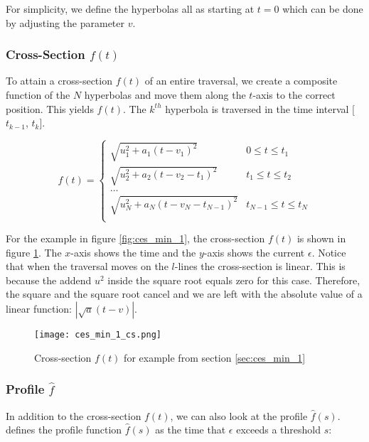 For simplicity, we define the hyperbolas all as starting at $t=0$ which can be done by adjusting the parameter $v$.


\subsubsection{Cross-Section $f(t)$}

To attain a cross-section $f(t)$ of an entire traversal, we create a composite function of the $N$ hyperbolas and move them along the $t$-axis to the correct position. This yields $f(t)$. The $k^{th}$ hyperbola is traversed in the time interval [$t_{k-1}$, $t_k$].

\[ f(t) =
\begin{cases} 
	\sqrt{u_1^2 + a_1(t - v_1)^2} & 0 \leq t \leq t_1 \\
	\sqrt{u_2^2 + a_2(t - v_2 - t_1)^2} & t_1 \leq t \leq t_2 \\
	\dots \\
	\sqrt{u_N^2 + a_N(t - v_N - t_{N-1})^2} & t_{N-1} \leq t \leq t_N \\
\end{cases}
\]

For the example in figure \ref{fig:ces_min_1}, the cross-section $f(t)$ is shown in figure \ref{fig:ces_min_1_cs}. The $x$-axis shows the time and the $y$-axis shows the current $\epsilon$. Notice that when the traversal moves on the $l$-lines the cross-section is linear. This is because the addend $u^2$ inside the square root equals zero for this case. Therefore, the square and the square root cancel and we are left with the absolute value of a linear function: $\left| \sqrt{a}(t - v) \right|$.

 \begin{figure}[H]
    \centering
    
    \texttt{[image: ces\_min\_1\_cs.png]}
		
	\caption{Cross-section $f(t)$ for example from section \ref{sec:ces_min_1}\protect\footnotemark}
    \label{fig:ces_min_1_cs}
\end{figure}


\subsubsection{Profile $\hat{f}$}

In addition to the cross-section $f(t)$, we can also look at the profile $\hat{f}(s)$. \citeauthor{rotelex} defines the profile function $\hat{f}(s)$ as the time that $\epsilon$ exceeds a threshold $s$:

